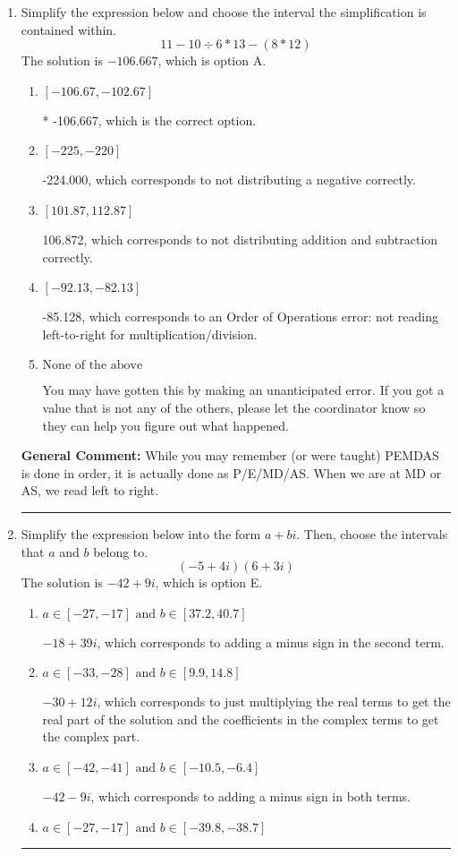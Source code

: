 \documentclass{extbook}[14pt]
\newcommand{\litem}[1]{\item #1

\rule{\textwidth}{0.4pt}}
\begin{document}
\begin{enumerate}\litem{
Simplify the expression below and choose the interval the simplification is contained within.
\[ 11 - 10 \div 6 * 13 - (8 * 12) \]The solution is \( -106.667 \), which is option A.\begin{enumerate}[label=\Alph*.]
\item \( [-106.67, -102.67] \)

* -106.667, which is the correct option.
\item \( [-225, -220] \)

 -224.000, which corresponds to not distributing a negative correctly.
\item \( [101.87, 112.87] \)

 106.872, which corresponds to not distributing addition and subtraction correctly.
\item \( [-92.13, -82.13] \)

 -85.128, which corresponds to an Order of Operations error: not reading left-to-right for multiplication/division.
\item \( \text{None of the above} \)

 You may have gotten this by making an unanticipated error. If you got a value that is not any of the others, please let the coordinator know so they can help you figure out what happened.
\end{enumerate}

\textbf{General Comment:} While you may remember (or were taught) PEMDAS is done in order, it is actually done as P/E/MD/AS. When we are at MD or AS, we read left to right.
}
\litem{
Simplify the expression below into the form $a+bi$. Then, choose the intervals that $a$ and $b$ belong to.
\[ (-5 + 4 i)(6 + 3 i) \]The solution is \( -42 + 9 i \), which is option E.\begin{enumerate}[label=\Alph*.]
\item \( a \in [-27, -17] \text{ and } b \in [37.2, 40.7] \)

 $-18 + 39 i$, which corresponds to adding a minus sign in the second term.
\item \( a \in [-33, -28] \text{ and } b \in [9.9, 14.8] \)

 $-30 + 12 i$, which corresponds to just multiplying the real terms to get the real part of the solution and the coefficients in the complex terms to get the complex part.
\item \( a \in [-42, -41] \text{ and } b \in [-10.5, -6.4] \)

 $-42 - 9 i$, which corresponds to adding a minus sign in both terms.
\item \( a \in [-27, -17] \text{ and } b \in [-39.8, -38.7] \)


\end{enumerate}}
\end{enumerate}
\end{document}
